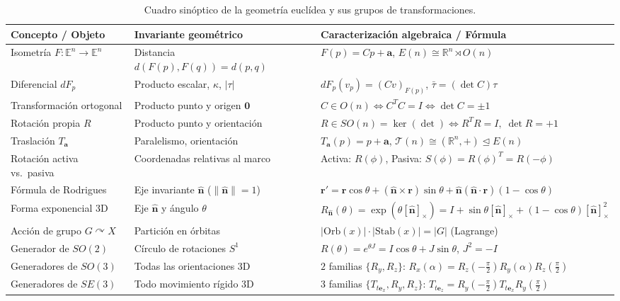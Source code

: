 \documentclass[11pt,letterpaper]{article}
\newcommand{\manualsection}[1]{%
  \Needspace{8\baselineskip}%
  \vspace{0.4cm}
  \par\noindent{\Large\bfseries\color{blackmain} #1}\par\nobreak
  \noindent{\color{orangeacc}\rule{\linewidth}{1.4pt}}\par\nobreak
  \vspace{0.18cm}
}
\begin{document}
\manualsection{12.Cuadro resumen}
\begin{table}[htbp]
\centering
\renewcommand{\arraystretch}{1.4}
\small
\begin{tabular}{@{}lll@{}}
  \toprule
  \textbf{Concepto / Objeto} & \textbf{Invariante geométrico} & \textbf{Caracterización algebraica / Fórmula} \\
  \midrule
  Isometría $F:\mathbb{E}^n\to\mathbb{E}^n$ & Distancia $d(F(p),F(q))=d(p,q)$ & $F(p)=Cp+\mathbf{a}$, \quad $E(n)\cong\mathbb{R}^n\rtimes O(n)$ \\
  Diferencial $dF_p$ & Producto escalar, $\kappa$, $|\tau|$ & $dF_p(v_p)=(Cv)_{F(p)}$, \quad $\bar\tau = (\det C)\tau$ \\
  Transformación ortogonal & Producto punto y origen $\mathbf{0}$ & $C\in O(n) \iff C^TC=I \iff \det C=\pm 1$ \\
  Rotación propia $R$ & Producto punto y orientación & $R\in SO(n)=\ker(\det) \iff R^TR=I,\;\det R=+1$ \\
  Traslación $T_{\mathbf{a}}$ & Paralelismo, orientación & $T_{\mathbf{a}}(p)=p+\mathbf{a}$, \quad $\mathcal{T}(n)\cong(\mathbb{R}^n,+)\trianglelefteq E(n)$ \\
  \midrule
  Rotación activa vs.\ pasiva & Coordenadas relativas al marco & Activa: $R(\phi)$, \quad Pasiva: $S(\phi)=R(\phi)^T=R(-\phi)$ \\
  Fórmula de Rodrigues & Eje invariante $\hat{\mathbf{n}}$ ($\|\hat{\mathbf{n}}\|=1$) & $\mathbf{r}'=\mathbf{r}\cos\theta+(\hat{\mathbf{n}}\times\mathbf{r})\sin\theta+\hat{\mathbf{n}}(\hat{\mathbf{n}}\cdot\mathbf{r})(1-\cos\theta)$ \\
  Forma exponencial 3D & Eje $\hat{\mathbf{n}}$ y ángulo $\theta$ & $R_{\hat{\mathbf{n}}}(\theta) = \exp(\theta[\hat{\mathbf{n}}]_\times) = I + \sin\theta[\hat{\mathbf{n}}]_\times + (1-\cos\theta)[\hat{\mathbf{n}}]_\times^2$ \\
  \midrule
  Acción de grupo $G\curvearrowright X$ & Partición en órbitas & $|\mathrm{Orb}(x)|\cdot|\mathrm{Stab}(x)| = |G|$ \quad (Lagrange) \\
  Generador de $SO(2)$ & Círculo de rotaciones $S^1$ & $R(\theta)=e^{\theta J}=I\cos\theta+J\sin\theta$, \quad $J^2=-I$ \\
  Generadores de $SO(3)$ & Todas las orientaciones 3D & $2$ familias $\{R_y,R_z\}$: $R_x(\alpha)=R_z(-\frac{\pi}{2})R_y(\alpha)R_z(\frac{\pi}{2})$ \\
  Generadores de $SE(3)$ & Todo movimiento rígido 3D & $3$ familias $\{T_{t\mathbf{e}_x},R_y,R_z\}$: $T_{t\mathbf{e}_z}=R_y(-\frac{\pi}{2})T_{t\mathbf{e}_x}R_y(\frac{\pi}{2})$ \\
  \bottomrule
\end{tabular}
\caption{Cuadro sinóptico de la geometría euclídea y sus grupos de transformaciones.}
\label{tab:resumen}
\end{table}
\end{document}
